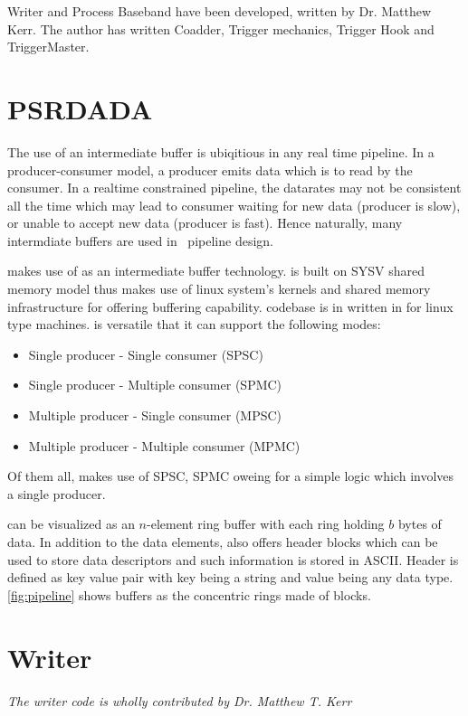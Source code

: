 \par Writer and Process Baseband have been developed, written by Dr. Matthew Kerr. The author has written Coadder, Trigger mechanics, Trigger Hook and TriggerMaster.

\section {PSRDADA}
\par The use of an intermediate buffer is ubiqitious in any real time pipeline. In a producer-consumer model, a producer emits data which is to read by the consumer. 
In a realtime constrained pipeline, the datarates may not be consistent all the time which may lead to consumer waiting for new data (producer is slow), or unable to accept new data (producer is fast).
Hence naturally, many intermdiate buffers are used in \vf~pipeline design.

\par \vf makes use of \dada as an intermediate buffer technology. \dada is built on SYSV shared memory model thus makes use of linux system's kernels and shared memory infrastructure for offering buffering capability. 
\dada codebase is in written in \cc for linux type machines. \dada is versatile that it can support the following modes:
\begin{itemize}
\item Single producer - Single consumer (SPSC)
\item Single producer - Multiple consumer (SPMC)
\item Multiple producer - Single consumer (MPSC)
\item Multiple producer - Multiple consumer (MPMC)
\end{itemize}
Of them all, \vf makes use of SPSC, SPMC oweing for a simple logic which involves a single producer.

\par \dada can be visualized as an $n$-element ring buffer with each ring holding $b$ bytes of data. In addition to the data elements, \dada also offers header blocks which can be used to store data descriptors and such information is stored in ASCII.
Header is defined as key value pair with key being a string and value being any data type.
\autoref{fig:pipeline} shows \dada buffers as the concentric rings made of blocks.

\section {Writer} 
\hfill \emph {The writer code is wholly contributed by Dr. Matthew T. Kerr}

